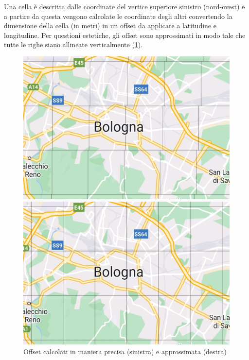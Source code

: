 Una cella è descritta dalle coordinate del vertice superiore sinistro (nord-ovest) e a partire da questa vengono calcolate le coordinate degli altri convertendo la dimensione della cella (in metri) in un offset da applicare a latitudine e longitudine.
Per questioni estetiche, gli offset sono approssimati in modo tale che tutte le righe siano allineate verticalmente (\cref{fig:tile_offset}).
\begin{figure}[H]
    \centering
    \begin{minipage}[b]{0.45\textwidth}
      \includegraphics[width=\textwidth]{./img/tile_no_approx.jpg}
    \end{minipage}
    \hfill
    \begin{minipage}[b]{0.45\textwidth}
      \includegraphics[width=\textwidth]{./img/tile_approx.jpg}
    \end{minipage}
    \caption{Offset calcolati in maniera precisa (sinistra) e approssimata (destra)} \label{fig:tile_offset}
\end{figure}

